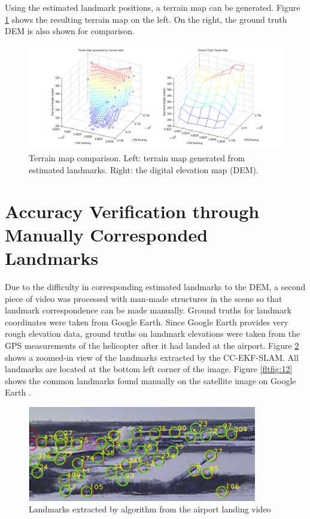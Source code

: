 Using the estimated landmark positions, a terrain map can be
generated. Figure \ref{fltfig:10} shows the resulting terrain map on
the left. On the right, the ground truth DEM is also shown for
comparison.

\begin{figure}[h]
\centering
\includegraphics[width=14cm, keepaspectratio=true]
{./Figures/fltfig/cut1/terrain/terrain_map_cmp.png}
\caption{Terrain map comparison. Left: terrain map generated from
  estimated landmarks. Right: the digital elevation map (DEM). }
\label{fltfig:10}
\end{figure}
\FloatBarrier

\section{Accuracy Verification through Manually Corresponded Landmarks}
\label{sec:flight-manual}
Due to the difficulty in corresponding estimated landmarks to the DEM,
a second piece of video was processed with man-made
structures in the scene so that landmark correspondence can be made
manually. Ground truths for landmark coordinates were taken from Google
Earth. Since Google Earth provides very rough elevation data,
ground truths on landmark elevations were taken from the GPS measurements of the
helicopter after it had landed at the airport. Figure \ref{fltfig:11}
shows a zoomed-in view of the landmarks extracted by the CC-EKF-SLAM.
All landmarks are located at the bottom left corner of the image.
Figure \ref{fltfig:12} shows the common landmarks found manually on
the satellite image on Google Earth \cite{_google_????}.

\begin{figure}[h]
\centering
\includegraphics[width=10cm, keepaspectratio=true]
{./Figures/fltfig/airport/frame398_landmarks.jpg}
\caption{Landmarks extracted by algorithm from the airport landing video }
\label{fltfig:11}
\end{figure}

